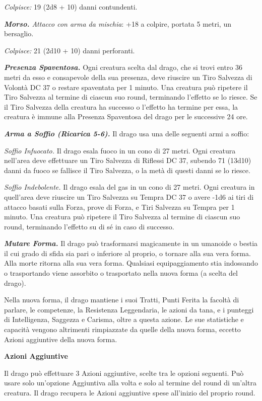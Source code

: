 \begin{multicols}{2}
{\emph{Colpisce:} 19 (2d8 + 10) danni contundenti.

\emph{\textbf{Morso.} Attacco con arma da mischia}: +18 a colpire, portata 5 metri, un bersaglio.

\emph{Colpisce:} 21 (2d10 + 10) danni perforanti.

\emph{\textbf{Presenza Spaventosa.}} Ogni creatura scelta dal drago, che si trovi entro 36 metri da esso e consapevole della sua presenza, deve riuscire un Tiro Salvezza di Volontà DC 37 o restare spaventata per 1 minuto. Una creatura può ripetere il Tiro Salvezza al termine di ciascun suo round, terminando l'effetto se lo riesce. Se il Tiro Salvezza della creatura ha successo o l'effetto ha termine per essa, la creatura è immune alla Presenza Spaventosa del drago per le successive 24 ore.

\emph{\textbf{Arma a Soffio (Ricarica 5-6).}} Il drago usa una delle seguenti armi a soffio:

\emph{Soffio Infuocato.} Il drago esala fuoco in un cono di 27 metri. Ogni creatura nell'area deve effettuare un Tiro Salvezza di Riflessi DC 37, subendo 71 (13d10) danni da fuoco se fallisce il Tiro Salvezza, o la metà di questi danni se lo riesce.

\emph{Soffio Indebolente.} Il drago esala del gas in un cono di 27 metri. Ogni creatura in quell'area deve riuscire un Tiro Salvezza su Tempra DC 37 o avere -1d6 ai tiri di attacco basati sulla Forza, prove di Forza, e Tiri Salvezza su Tempra per 1 minuto. Una creatura può ripetere il Tiro Salvezza al termine di ciascun suo round, terminando l'effetto su di sé in caso di successo.

\emph{\textbf{Mutare Forma.}} Il drago può trasformarsi magicamente in un umanoide o bestia il cui grado di sfida sia pari o inferiore al proprio, o tornare alla sua vera forma. Alla morte ritorna alla sua vera forma. Qualsiasi equipaggiamento stia indossando o trasportando viene assorbito o trasportato nella nuova forma (a scelta del drago).

Nella nuova forma, il drago mantiene i suoi Tratti, Punti Ferita la facoltà di parlare, le competenze, la Resistenza Leggendaria, le azioni da tana, e i punteggi di Intelligenza, Saggezza e Carisma, oltre a questa azione. Le sue statistiche e capacità vengono altrimenti rimpiazzate da quelle della nuova forma, eccetto Azioni aggiuntive della nuova forma.

\textbf{Azioni Aggiuntive}

Il drago può effettuare 3 Azioni aggiuntive, scelte tra le opzioni seguenti. Può usare solo un'opzione Aggiuntiva alla volta e solo al termine del round di un'altra creatura. Il drago recupera le Azioni aggiuntive spese all'inizio del proprio round.

}
\end{multicols}
